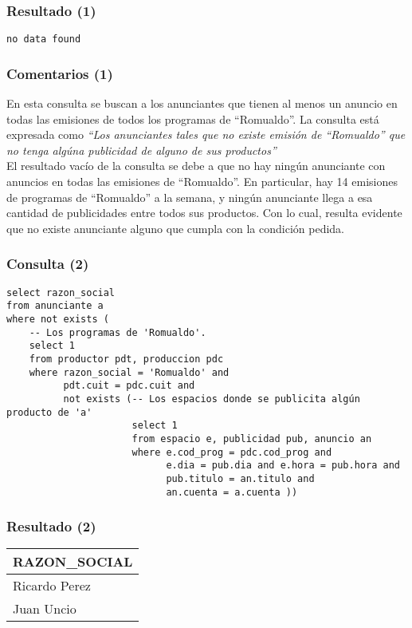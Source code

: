 \subsubsection*{Resultado (1)}
\texttt{no data found}

\subsubsection*{Comentarios (1)}
En esta consulta se buscan a los anunciantes que tienen al menos un anuncio en todas las emisiones de todos los programas de ``Romualdo''. La consulta está expresada como \textit{``Los anunciantes tales que no existe emisión de ``Romualdo'' que no tenga algúna publicidad de alguno de sus productos''} \\

El resultado vacío de la consulta se debe a que no hay ningún anunciante con anuncios en todas las emisiones de ``Romualdo''. En particular, hay 14 emisiones de programas de ``Romualdo'' a la semana, y ningún anunciante llega a esa cantidad de publicidades entre todos sus productos. Con lo cual, resulta evidente que no existe anunciante alguno que cumpla con la condición pedida. \\

\subsubsection*{Consulta (2)}

\begin{lstlisting} 
select razon_social
from anunciante a
where not exists (
    -- Los programas de 'Romualdo'.
    select 1
    from productor pdt, produccion pdc
    where razon_social = 'Romualdo' and
          pdt.cuit = pdc.cuit and 
          not exists (-- Los espacios donde se publicita algún producto de 'a'
                      select 1 
                      from espacio e, publicidad pub, anuncio an
                      where e.cod_prog = pdc.cod_prog and
                            e.dia = pub.dia and e.hora = pub.hora and
                            pub.titulo = an.titulo and
                            an.cuenta = a.cuenta ))
\end{lstlisting}

\subsubsection*{Resultado (2)}
\begin{tabular}{|l|}
  \hline
    \bf{RAZON_SOCIAL} \\ 
  \hline
    Ricardo Perez \\ 
    Juan Uncio \\
  \hline
\end{tabular} 

